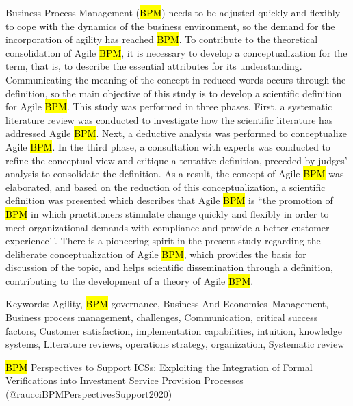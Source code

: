 \documentclass[
  letterpaper,
  DIV=11,
  numbers=noendperiod]{scrartcl}
\begin{document}
Business Process Management (\hl{BPM}) needs to be adjusted quickly and
flexibly to cope with the dynamics of the business environment, so the
demand for the incorporation of agility has reached \hl{BPM}. To
contribute to the theoretical consolidation of Agile \hl{BPM}, it is
necessary to develop a conceptualization for the term, that is, to
describe the essential attributes for its understanding. Communicating
the meaning of the concept in reduced words occurs through the
definition, so the main objective of this study is to develop a
scientific definition for Agile \hl{BPM}. This study was performed in
three phases. First, a systematic literature review was conducted to
investigate how the scientific literature has addressed Agile \hl{BPM}.
Next, a deductive analysis was performed to conceptualize Agile
\hl{BPM}. In the third phase, a consultation with experts was conducted
to refine the conceptual view and critique a tentative definition,
preceded by judges' analysis to consolidate the definition. As a result,
the concept of Agile \hl{BPM} was elaborated, and based on the reduction
of this conceptualization, a scientific definition was presented which
describes that Agile \hl{BPM} is ``the promotion of \hl{BPM} in which
practitioners stimulate change quickly and flexibly in order to meet
organizational demands with compliance and provide a better customer
experience'\,'. There is a pioneering spirit in the present study
regarding the deliberate conceptualization of Agile \hl{BPM}, which
provides the basis for discussion of the topic, and helps scientific
dissemination through a definition, contributing to the development of a
theory of Agile \hl{BPM}.

Keywords: Agility, \hl{BPM} governance, Business And
Economics--Management, Business process management, challenges,
Communication, critical success factors, Customer satisfaction,
implementation capabilities, intuition, knowledge systems, Literature
reviews, operations strategy, organization, Systematic review

\hl{BPM} Perspectives to Support ICSs: Exploiting the Integration of
Formal Verifications into Investment Service Provision Processes
(@raucciBPMPerspectivesSupport2020)
\end{document}
